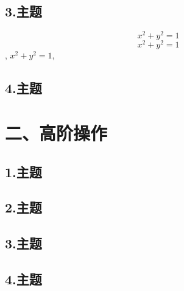 \documentclass[12pt,hyperref,UTF8,aspectratio=169]{beamer}
\begin{document}
\subsection{3.主题}

\begin{frame}
    \[ x^2+y^2=1 \]
    $$ x^2+y^2=1 $$, $ x^2+y^2=1 $, 
\end{frame}

\subsection{4.主题}

\section{二、高阶操作}
\subsection{1.主题}
\subsection{2.主题}
\subsection{3.主题}
\subsection{4.主题}
\end{document}

